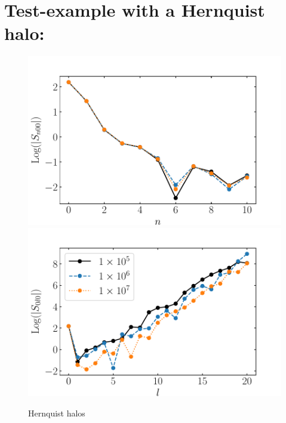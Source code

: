 \documentclass[14pt]{article}
\begin{document}
\section{Test-example with a Hernquist halo:}


\begin{figure}[h]
  \centering
  \includegraphics[scale=0.5]{../code/S_n_henrquist.pdf}
  \includegraphics[scale=0.5]{../code/S_l_henrquist.pdf}
  \caption{Hernquist halos}

\end{figure}
\end{document}
